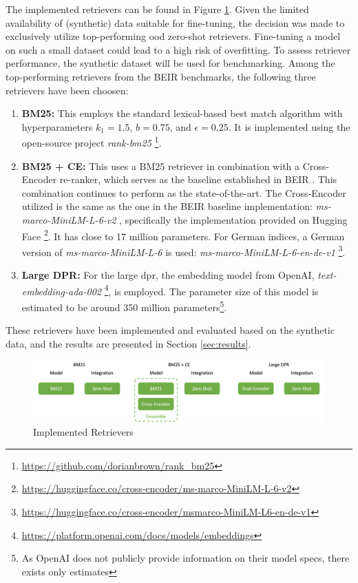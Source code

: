 The implemented retrievers can be found in Figure \ref{fig:retriever-implementation}. Given the limited availability of (synthetic) data suitable for fine-tuning, the decision was made to exclusively utilize top-performing \gls{ood} zero-shot retrievers. Fine-tuning a model on such a small dataset could lead to a high risk of overfitting. To assess retriever performance, the synthetic dataset will be used for benchmarking. Among the top-performing retrievers from the BEIR benchmarks, the following three retrievers have been choosen:

\begin{enumerate}
    \item \textbf{BM25:} This employs the standard lexical-based best match algorithm with hyperparameters $k_1=1.5$, $b=0.75$, and $\epsilon=0.25$. It is implemented using the open-source project \textit{rank-bm25} \footnote{\url{https://github.com/dorianbrown/rank_bm25}}.
    \item \textbf{BM25 + CE:} This uses a BM25 retriever in combination with a Cross-Encoder re-ranker, which serves as the baseline established in BEIR \cite{thakur_beir_2021}. This combination continues to perform as the state-of-the-art. The Cross-Encoder utilized is the same as the one in the BEIR baseline implementation: \textit{ms-marco-MiniLM-L-6-v2} \cite{wang_minilm_2020}, specifically the implementation provided on Hugging Face \footnote{\url{https://huggingface.co/cross-encoder/ms-marco-MiniLM-L-6-v2}}. It has close to 17 million parameters. For German indices, a German version of \textit{ms-marco-MiniLM-L-6} is used: \textit{ms-marco-MiniLM-L-6-en-de-v1} \footnote{\url{https://huggingface.co/cross-encoder/msmarco-MiniLM-L6-en-de-v1}}.
    \item \textbf{Large DPR:} For the large \gls{dpr}, the embedding model from OpenAI, \textit{text-embedding-ada-002} \footnote{\url{https://platform.openai.com/docs/models/embeddings}}, is employed. The parameter size of this model is estimated to be around 350 million parameters\cite{muennighoff_sgpt_2022}\footnote{As OpenAI does not publicly provide information on their model specs, there exists only estimates}.
\end{enumerate}

These retrievers have been implemented and evaluated based on the synthetic data, and the results are presented in Section \ref{sec:results}.

\begin{figure}
    \centering
    \includegraphics[width=\textwidth]{Grafiken/Evaluation/retriever_implemented.png}    
    \caption{Implemented Retrievers}
    \label{fig:retriever-implementation}
\end{figure}

